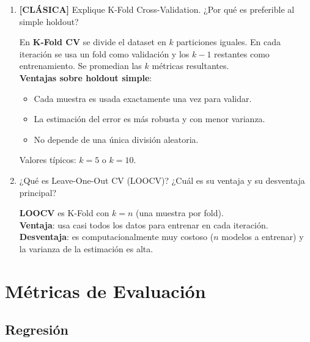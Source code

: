 \documentclass[11pt,a4paper]{article}
\begin{document}
\begin{enumerate}[label=\textbf{P\arabic*.}, resume]

\item \leavevmode

\begin{classicbox}
\textcolor{tdred}{\textbf{[CL\'ASICA]}} Explique K-Fold Cross-Validation. ¿Por qu\'e
es preferible al simple holdout?
\end{classicbox}

\begin{answerbox}
En \textbf{K-Fold CV} se divide el dataset en $k$ particiones iguales. En cada iteraci\'on
se usa un fold como validaci\'on y los $k-1$ restantes como entrenamiento. Se promedian
las $k$ m\'etricas resultantes.\\[4pt]
\textbf{Ventajas sobre holdout simple}:
\begin{itemize}[topsep=2pt, itemsep=2pt]
  \item Cada muestra es usada exactamente una vez para validar.
  \item La estimaci\'on del error es m\'as robusta y con menor varianza.
  \item No depende de una \'unica divisi\'on aleatoria.
\end{itemize}
Valores t\'ipicos: $k=5$ o $k=10$.
\end{answerbox}

\item ¿Qu\'e es Leave-One-Out CV (LOOCV)? ¿Cu\'al es su ventaja y su desventaja principal?

\begin{answerbox}
\textbf{LOOCV} es K-Fold con $k=n$ (una muestra por fold). \\
\textbf{Ventaja}: usa casi todos los datos para entrenar en cada iteraci\'on.\\
\textbf{Desventaja}: es computacionalmente muy costoso ($n$ modelos a entrenar) y la
varianza de la estimaci\'on es alta.
\end{answerbox}

\end{enumerate}

\section{M\'etricas de Evaluaci\'on}

\subsection{Regresi\'on}
\end{document}

